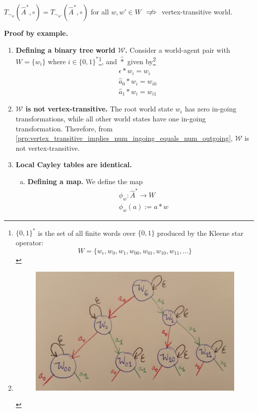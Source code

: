 \begin{propositionE}
     $T_{\sim_{w}}(\hat{A}^{*}, \circ) = T_{\sim_{w'}}(\hat{A}^{*}, \circ)$ for all $w, w' \in W$ $\centernot\implies$ vertex-transitive world.
\end{propositionE}
\begin{proofE}
\textbf{Proof by example.}
\begin{enumerate}[(1)]
    \item \textbf{Defining a binary tree world $\mathscr{W}$.}
    Consider a world-agent pair with $W = \{w_{i}\}$ where $i \in \{0, 1\}^{*}$\footnote{
    $\{0, 1\}^{*}$ is the set of all finite words over $\{0, 1\}$ produced by the Kleene star operator:
    \begin{equation}
        W = \{ w_{\epsilon}, w_{0}, w_{1}, w_{00}, w_{01}, w_{10}, w_{11}, \dots \}
    \end{equation}
    }, and $\hat{\ast}$ given by\footnote{
    \begin{figure}[H]
        \includegraphics[width=0.5\linewidth]{6BeyondSBDRLLocalAlgebras/Images/binary_tree_world.jpeg}
        \caption{}
    \end{figure}
    }
    \begin{align}
        & \epsilon \ast w_{i} = w_{i} \\
        & \hat{a}_{0} \ast w_{i} = w_{i0} \\
        & \hat{a}_{1} \ast w_{i} = w_{i1}
    \end{align}

    \item \textbf{$\mathscr{W}$ is not vertex-transitive.}
    The root world state $w_{\epsilon}$ has zero in-going transformations, while all other world states have one in-going transformation.
    Therefore, from \cref{prp:vertex_transitive_implies_num_ingoing_equals_num_outgoing}, $\mathscr{W}$ is not vertex-transitive.

    \item \textbf{Local Cayley tables are identical.}
    \begin{enumerate}[(a)]
        \item \textbf{Defining a map.}
        We define the map
        \begin{align}
            & \phi_{w}: \hat{A}^{*} \to W \\
            & \phi_{w}(a) := a \ast w
        \end{align}


\end{enumerate}
\end{enumerate}
\end{proofE}
